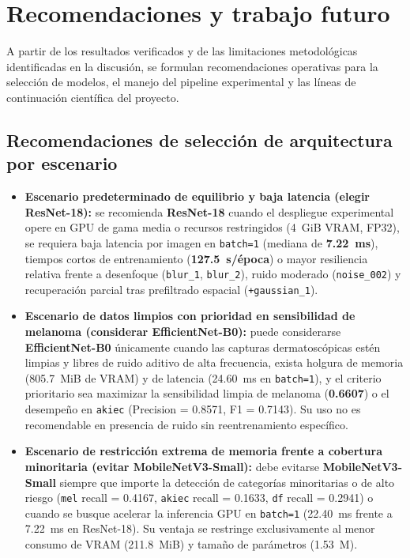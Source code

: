 \FloatBarrier\clearpage\section{Recomendaciones y trabajo futuro}
\label{sec:recomendaciones}

A partir de los resultados verificados y de las limitaciones metodológicas identificadas en la discusión, se formulan recomendaciones operativas para la selección de modelos, el manejo del pipeline experimental y las líneas de continuación científica del proyecto.

\subsection{Recomendaciones de selección de arquitectura por escenario}
\begin{itemize}[leftmargin=1.4em,itemsep=4pt]
\item \textbf{Escenario predeterminado de equilibrio y baja latencia (elegir ResNet-18):} se recomienda \textbf{ResNet-18} cuando el despliegue experimental opere en GPU de gama media o recursos restringidos (4~GiB VRAM, FP32), se requiera baja latencia por imagen en \texttt{batch=1} (mediana de \textbf{7.22~ms}), tiempos cortos de entrenamiento (\textbf{127.5~s/época}) o mayor resiliencia relativa frente a desenfoque (\texttt{blur\_1}, \texttt{blur\_2}), ruido moderado (\texttt{noise\_002}) y recuperación parcial tras prefiltrado espacial (\texttt{+gaussian\_1}).
\item \textbf{Escenario de datos limpios con prioridad en sensibilidad de melanoma (considerar EfficientNet-B0):} puede considerarse \textbf{EfficientNet-B0} únicamente cuando las capturas dermatoscópicas estén limpias y libres de ruido aditivo de alta frecuencia, exista holgura de memoria (805.7~MiB de VRAM) y de latencia (24.60~ms en \texttt{batch=1}), y el criterio prioritario sea maximizar la sensibilidad limpia de melanoma (\textbf{0.6607}) o el desempeño en \texttt{akiec} (Precision = 0.8571, F1 = 0.7143). Su uso no es recomendable en presencia de ruido sin reentrenamiento específico.
\item \textbf{Escenario de restricción extrema de memoria frente a cobertura minoritaria (evitar MobileNetV3-Small):} debe evitarse \textbf{MobileNetV3-Small} siempre que importe la detección de categorías minoritarias o de alto riesgo (\texttt{mel} recall = 0.4167, \texttt{akiec} recall = 0.1633, \texttt{df} recall = 0.2941) o cuando se busque acelerar la inferencia GPU en \texttt{batch=1} (22.40~ms frente a 7.22~ms en ResNet-18). Su ventaja se restringe exclusivamente al menor consumo de VRAM (211.8~MiB) y tamaño de parámetros (1.53~M).
\end{itemize}


